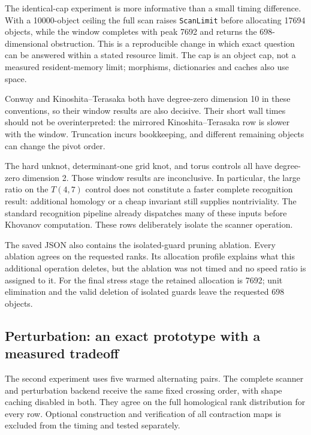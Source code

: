 The identical-cap experiment is more informative than a small timing
difference.  With a 10000-object ceiling the full scan raises
\texttt{ScanLimit} before allocating 17694 objects, while the window
completes with peak 7692 and returns the 698-dimensional obstruction.
This is a reproducible change in which exact question can be answered
within a stated resource limit.  The cap is an object cap, not a measured
resident-memory limit; morphisms, dictionaries and caches also use space.

Conway and Kinoshita--Terasaka both have degree-zero dimension 10 in these
conventions, so their window results are also decisive.  Their short wall
times should not be overinterpreted: the mirrored Kinoshita--Terasaka row
is slower with the window.  Truncation incurs bookkeeping, and different
remaining objects can change the pivot order.

The hard unknot, determinant-one grid knot, and torus controls all have
degree-zero dimension 2.  Those window results are inconclusive.  In
particular, the large ratio on the $T(4,7)$ control does not constitute
a faster complete recognition result: additional homology or a cheap
invariant still supplies nontriviality.  The standard recognition pipeline
already dispatches many of these inputs before Khovanov computation.
These rows deliberately isolate the scanner operation.

The saved JSON also contains the isolated-guard pruning ablation.  Every
ablation agrees on the requested ranks.  Its allocation profile explains
what this additional operation deletes, but the ablation was not timed
and no speed ratio is assigned to it.  For the final stress stage the
retained allocation is 7692; unit elimination and the valid deletion of
isolated guards leave the requested 698 objects.

\subsection{Perturbation: an exact prototype with a measured tradeoff}

The second experiment uses five warmed alternating pairs.  The complete
scanner and perturbation backend receive the same fixed crossing order,
with shape caching disabled in both.  They agree on the full homological
rank distribution for every row.  Optional construction and verification
of all contraction maps is excluded from the timing and tested separately.



